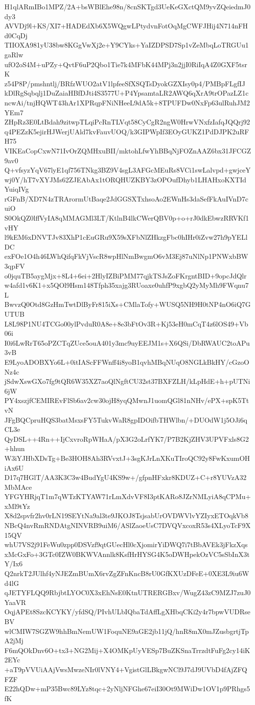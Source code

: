 H1qlARmIBo1MPZ/2A+bsWBlEhe98n/8cnSKTgd3UeKeGXctQM9yvZQeiedmJ0dy3
AVVDj9l+KS/XI7+HADEdXb6X5WQgwLPtydvnFotOqMgCWFJHij4N714nFHd0CqDj
TIIOXA981yU38bw8KGgVwXj2e+Y9CYks+YaIZDPSD7Sp1vZeMbqLoTRGUu1gaRlw
ufO2oS4M+uPZy+QvtF6uP2Qbo1Tie7k4MFbK44MPj3n2jjI0RiIqA4Z0GXF5tsrK
z54P8P/pmshntlj/BRfzWUO2atV1lpfeeSfXSQTsDyokGZXIsy0p4/PMBpFLgfIJ
kDlRgSqbqlj1DuZaiaHBfDJti4S3577U+P4YpsamtaLR2AWQ6qXrA9trOPazLZ1c
ncwAi/tnjHQWT43hAr1XPRqpFNiNHeeL9dA5k+8TPUFDw0NxFp63ulRuhJM2YEm7
ZHpRz3E0LtBdah9zitwpTLqiPcRnTLVqt58CyCgR2ngW0HrwVNxfzIafqJQQrj92
q4PEZzK5ejirHJWerjUAld7kvFauvUOQ/k3GIPWpIf3EOyGUKZ1PdDJPK2uRFH75
VIKEaCopCxwN71IvOrZQMHxuBII/mktohLfwYhBBqNjFOZnAAZ6bx31JFCGZ9av0
Q+vfsyzYqV67lyE1qf756TNkg3BZ9V4sgL3AFGcMEuRs8VCi1swLalvpd+gwjceY
wj0Y/hT7vXYJMs62ZJEAbAx1tORQHUZKBY3zOPOufDhyb1LHAHxoKXTIdYuiqIVg
rGFnB/XD7N4zTRArormUtBaqe2JdGGSXTxhsoAo2EWnHs3daSefFkAuIVnD7cuiO
S0OkQZ0lffVyIA8qMMAGMl3LT/KtlnB4lkCWerQBV0p+o+rJ0dkEbwzRRVKf1vHY
l9kEM6xDNVTJv83XhP1cEuGRu9X59sXFbNlZHkzgFbc0hIHr0iZvw27h9pYELlDC
exFOe1O4h46LWhQifqFkVjVscR8wpHlNmBwgmO6vM3Ej87uNlNp1PNWxbBW3qpFV
o0jquTB5aygMjx+8L4+6ei+2HlyIZBiPMM77qjkTSJsZoFKrgntBID+9opcJdQlr
w4afd1v6K1+x5QOl9Hsm148Tfph35xajg3RUoaxe0uhfP9xgbQ2yMyMh9FWqnu7L
BwvzQ0Otd8GzHmTwtDlByFr815iXs+CMlaTofy+WUSQ5NH9H0tNP4nO6iQ7GUTUB
L8L98P1NU4TCGo00ylPvduR0A8e+8e3bFtOv3R+Kj53eH0mCqT4z6lOS49+Vb06i
I0i6LwRrT65oPZCTqZUce5ouA401y3mc9uyEEJM1s+X6QSi/DbRWAUC2toAPu3vB
E9LyoADOBXYo6L+0itIAScFFWnff4i8yoB1qvhMBqNUqO8NGLkBkHY/cGzoONz4c
jSdwXswGXo7fg9tQR6W35XZ7aoQlNgftCU32st37BXFZLH/kLpHdE+h+pUTNi6jW
PY4xszjfCEMIREvFlSb6av2cw30ojH8yqQMwnJ1uomQGl81nNHv/ePX+spK5TtvN
JFgBQCpruHQS3batMsxsFY5TukvWaR8gpIDOifbTHWlbn/+DUOdW1j5OJi6qCL3e
QyDSL++4Rn++IjCxvroRpWHaA/pX3G2oLrfYK7/P7B2KjZHV3UPVFxls8G2+hhun
W3iYJHbXDsTg+Be3HOH8Ah3RVvxtJ+3sgKJrLnXKuTIroQC92y8FwKxumOHiAx6U
D17q7HGlT/AA3K3C3w4BudYgU4KS9w+/gfpnHFxkr8KDUZ+C+r8YUVzA32MbMAce
YFGYHRjqT1m7qWTzKTYAW71rLmXdvVF8I3ptKARo8JZrNMLyiA8qCPMu+xMl9tYz
X8d2spvfr2hv0rLN19SEYtNa9al3te9JKOJ8TsjsabUrOVDWVlvYZIyxETOqkVb8
NBcQ4nvRmRNDAtgNINVRB9uiM6/ASlZaoeUsC7DVQVxcoxR53s4XLyoTcF9X15QV
whU7VS2j91FeWu0zpp0DSVzf9qtGUecHl0cXjomirYiDWQ7i7tBbAVEk3jFkzXqs
xMcGxFo+3GTc0IZW0BKWVAnnlk8KsfHrHYSG4K5oDWHpekOzVC5sSbInX3tY/Ix6
Q2nrkT2JUlhf4yNJEZmBUmX6rvZgZFnKncB8rU0GfKXUzDFeE+0XE3L9iu6Wd4lG
qJETYFLQQ9RbjbtLYOC0X3xEhNsE0KtnUTRERGBxv/WugZ43zC9MZJ7zuJ0YaaVR
OqjAPEt8SzcKCYKY/yfdSQ/PIvhULbIQbaTdAffLgXHbqCKi2y4r7bpwVUDRseBV
wlCMIW7SGZW9hhBmNemUW1FoquNE9aGE2jb11jQ/hnR8mX0mJZusbgrtjTpA2jMj
F6mQOkDnv6O+tx3+NG2Mij+X4OMKpUyVESp7BuZKSnaTrrzdtFuFg2cy14iK2EYc
+aT9pVVUiAAjVwsMwzeNIr0lVNY4+VgistGlLBkgwNCl9J7dJ9UVbD4fAjZFQFZF
E22hQDw+mP35Bwc89LYz8tqc+2yNljNFGhe67eiI30Ot9MWiDw1OV1p9PRhgs5fK
